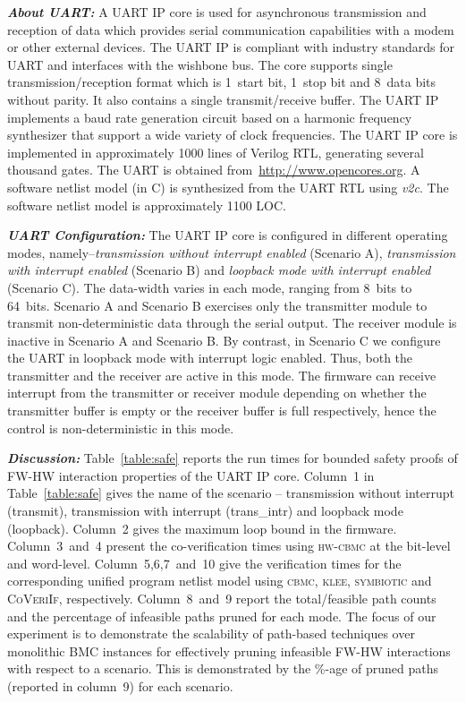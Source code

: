 \documentclass[sigconf]{acmart}
\newcommand{\tool}[1]{\textsc{#1}\xspace}
\newcommand{\cbmcv}{\tool{cbmc}}
\newcommand{\hwcbmcv}{\tool{hw-cbmc}}
\newcommand{\verifox}{\tool{CoVeriIf}}
\newcommand{\klee}{\tool{klee}}
\begin{document}
\textbf{\emph{About UART:}} A UART IP core is used for asynchronous
transmission and reception of data which provides serial communication
capabilities with a modem or other external devices.  The UART IP is
compliant with industry standards for UART and interfaces with the wishbone
bus.  The core supports single transmission/reception format which is
1~start bit, 1~stop bit and 8~data bits without parity.  It also contains a
single transmit/receive buffer.  The UART IP implements a baud rate
generation circuit based on a harmonic frequency synthesizer that support a
wide variety of clock frequencies.  The UART IP core is implemented in
approximately 1000 lines of Verilog RTL, generating several thousand gates. 
The UART is obtained from~\url{http://www.opencores.org}.  A software
netlist model (in C) is synthesized from the UART RTL using \emph{v2c}.  The
software netlist model is approximately 1100 LOC.

\textbf{\emph{UART Configuration:}} The UART IP core is configured in
different operating modes, namely--{\em transmission without interrupt
enabled} (Scenario A), {\em transmission with interrupt enabled} (Scenario
B) and {\em loopback mode with interrupt enabled} (Scenario C).  The
data-width varies in each mode, ranging from 8~bits to 64~bits.  Scenario A
and Scenario B exercises only the transmitter module to transmit
non-deterministic data through the serial output.  The receiver module is
inactive in Scenario A and Scenario B.  By contrast, in Scenario C we
configure the UART in loopback mode with interrupt logic enabled.  Thus,
both the transmitter and the receiver are active in this mode.  The firmware
can receive interrupt from the transmitter or receiver module depending on
whether the transmitter buffer is empty or the receiver buffer is full
respectively, hence the control is non-deterministic in this mode.

\textbf{\emph{Discussion:}}
Table~\ref{table:safe} reports the run times for bounded safety proofs of
FW-HW interaction properties of the UART IP core.  Column~1 in
Table~\ref{table:safe} gives the name of the scenario -- transmission
without interrupt (transmit), transmission with interrupt (trans\_intr) and
loopback mode (loopback).  Column~2 gives the maximum loop bound in the
firmware.  Column~3~and~4 present the co-verification times using \hwcbmcv
at the bit-level and word-level.  Column~5,6,7~and~10 give the verification
times for the corresponding unified program netlist model using \cbmcv,
\klee, \textsc{symbiotic} and \verifox, respectively.  Column~8~and~9 report
the total/feasible path counts and the percentage of infeasible paths pruned
for each mode.  The focus of our experiment is to demonstrate the
scalability of path-based techniques over monolithic BMC instances for
effectively pruning infeasible FW-HW interactions with respect to a
scenario.  This is demonstrated by the \%-age of pruned paths (reported in
column~9) for each scenario.
\end{document}
